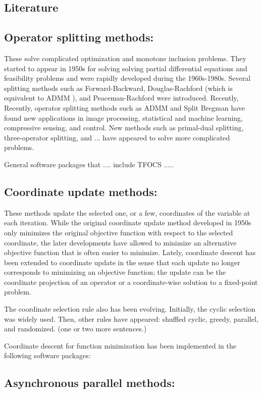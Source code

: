 \subsection{Literature}
\subsection*{Operator splitting methods:}  These solve complicated optimization and monotone inclusion problems. They started to appear in 1950s for solving  solving partial differential equations and feasibility problems and were rapidly developed during the 1960s-1980s. Several splitting methods such as Forward-Backward, Douglas-Rachford  (which is equivalent to ADMM \cite{?,?}), and Peaceman-Rachford were introduced. Recently,  Recently,
operator splitting methods such as ADMM and Split Bregman have found new applications in image processing,
statistical and machine learning, compressive sensing, and control. New methods such as primal-dual splitting, three-operator splitting, and ... have appeared to solve more complicated problems.

General software packages that .... include TFOCS .....

\subsection*{Coordinate update methods:}
These methods update the selected one, or a few, coordinates of the variable at each iteration.  While the original  coordinate update method developed in 1950s only minimizes the original objective function with respect to the selected coordinate, the later developments have allowed to minimize an alternative objective function that is often easier to minimize. Lately, coordinate descent has been extended to coordinate update in the sense that each update no longer corresponds to minimizing an objective function; the update can be the coordinate projection of an operator or a coordinate-wise solution to a fixed-point problem.

The coordinate selection rule also has been evolving. Initially, the  cyclic selection was widely used. Then, other rules have appeared: shuffled cyclic, greedy, parallel, and randomized. (one or two more sentences.)

Coordinate descent for function minimization has been implemented in the following software packages: 

\subsection*{Asynchronous parallel methods:} 


